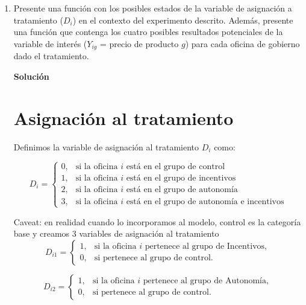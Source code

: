 \documentclass[a4paper, answers, addpoints, 11pt]{exam}
\newenvironment{solucion}{%
  \begin{mdframed}[
    backgroundcolor=blue!5,    %
    linecolor=blue!50,          %
    linewidth=2pt,              %
    leftmargin=10pt,            %
    rightmargin=10pt,           %
    topline=true,              %
    bottomline=true,            %
    roundcorner=10pt,           %
    innerleftmargin=10pt,       %
    innerrightmargin=10pt,      %
    innerbottommargin=10pt,     %
    innertopmargin=10pt         %
  ]%
  \begin{tcolorbox}[colframe=blue!50!black, colback=blue!50, coltitle=white, sharp corners=all, boxrule=1mm, width=\textwidth, halign=left, valign=center, top=0mm, bottom=0mm, left=0mm, right=0mm] \textbf{Solución} \end{tcolorbox} }{\end{mdframed}}
\begin{document}
\begin{enumerate}
  
    \item Presente una función con los posibles estados de la variable de asignación a tratamiento ($D_i$) en el contexto del experimento descrito. Además, presente una función que contenga los cuatro posibles resultados potenciales de la variable de interés ($Y_{ig}$ = precio de producto $g$) para cada oficina de gobierno dado el tratamiento. 

      
  \begin{solucion}
        \section*{Asignación al tratamiento}  
    Definimos la variable de asignación al tratamiento $D_i$ como:

\begin{equation*}
    D_i = \begin{cases}
        0, & \text{si la oficina $i$ está en el grupo de control} \\
        1, & \text{si la oficina $i$ está en el grupo de incentivos} \\
        2, & \text{si la oficina $i$ está en el grupo de autonomía} \\
        3, & \text{si la oficina $i$ está en el grupo de autonomía e incentivos}
    \end{cases}
\end{equation*}

\begin{mdframed}[backgroundcolor=moraditoClaro]
    
Caveat: en realidad cuando lo incorporamos al modelo, control es la categoría base y creamos 3 variables de asignación al tratamiento
\begin{equation*}
D_{i1} =
\begin{cases}
    1, & \text{si la oficina } i \text{ pertenece al grupo de Incentivos}, \\
    0, & \text{si pertenece al grupo de control}.
\end{cases}
\end{equation*}

\begin{equation*}
D_{i2} =
\begin{cases}
    1, & \text{si la oficina } i \text{ pertenece al grupo de Autonomía}, \\
    0, & \text{si pertenece al grupo de control}.
\end{cases}
\end{equation*}


\end{mdframed}
\end{solucion}
\end{enumerate}
\end{document}
